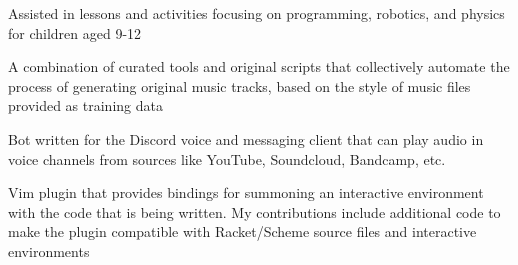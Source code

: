 \documentclass[10pt,a4paper]{altacv}
\begin{document}
Assisted in lessons and activities focusing on programming, robotics, and 
physics for children aged 9-12

\bigskip


A combination of curated tools and original scripts that collectively automate 
the process of generating original music tracks, based on the style of music 
files provided as training data

\divider

Bot written for the Discord voice and messaging client that can play audio in 
voice channels from sources like YouTube, Soundcloud, Bandcamp, etc.

\divider

Vim plugin that provides bindings for summoning an interactive environment with 
the code that is being written. My contributions include additional code to make 
the plugin compatible with Racket/Scheme source files and interactive environments

\medskip










\end{document}
